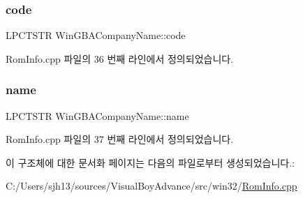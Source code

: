 \subsubsection{\texorpdfstring{code}{code}}
{\footnotesize\ttfamily L\+P\+C\+T\+S\+TR Win\+G\+B\+A\+Company\+Name\+::code}



Rom\+Info.\+cpp 파일의 36 번째 라인에서 정의되었습니다.

\mbox{\label{struct_win_g_b_a_company_name_a61746fed679453b425013ae539c4c3a7}} 
\subsubsection{\texorpdfstring{name}{name}}
{\footnotesize\ttfamily L\+P\+C\+T\+S\+TR Win\+G\+B\+A\+Company\+Name\+::name}



Rom\+Info.\+cpp 파일의 37 번째 라인에서 정의되었습니다.



이 구조체에 대한 문서화 페이지는 다음의 파일로부터 생성되었습니다.\+:\begin{DoxyCompactItemize}
\item 
C\+:/\+Users/sjh13/sources/\+Visual\+Boy\+Advance/src/win32/\mbox{\hyperlink{_rom_info_8cpp}{Rom\+Info.\+cpp}}\end{DoxyCompactItemize}
